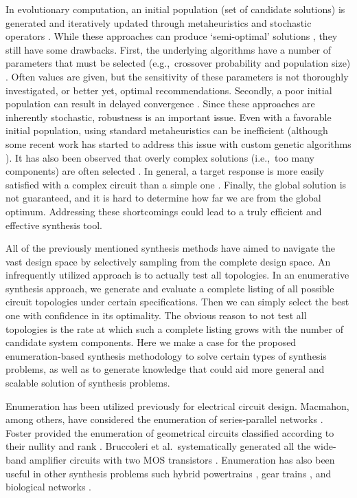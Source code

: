 In evolutionary computation, an initial population (set of candidate solutions) is generated and iteratively updated through metaheuristics and stochastic operators \cite{Eiben2003a}.
While these approaches  can produce `semi-optimal' solutions \cite{Das2007a}, they still have some drawbacks. 
First, the underlying algorithms have a number of parameters that must be selected (e.g.,~crossover probability and population size) \cite{Eiben2003a, Grimbleby1995a, Goh2001a, Koza1997a, Lohn1999a}.
Often values are given, but the sensitivity of these parameters is not thoroughly investigated, or better yet, optimal recommendations.
Secondly, a poor initial population can result in delayed convergence \cite{Das2007a}.
Since these approaches are inherently stochastic, robustness is an important issue.
Even with a favorable initial population, using standard metaheuristics can be inefficient (although some recent work has started to address this issue with custom genetic algorithms \cite{Das2007a}).
It has also been observed that overly complex solutions (i.e.,~too many components) are often selected \cite{Goh2001a, Grimbleby1995a, Grimbleby2000a}. 
In general, a target response is more easily satisfied with a complex circuit than a simple one \cite{Grimbleby1995a}.
Finally, the global solution is not guaranteed, and it is hard to determine how far we are from the global optimum.
Addressing these shortcomings could lead to a truly efficient and effective synthesis tool.

All of the previously mentioned synthesis methods have aimed to navigate the vast design space by selectively sampling from the complete design space.
An infrequently utilized approach is to actually test all topologies. %
In an enumerative synthesis approach, we generate and evaluate a complete listing of all possible circuit topologies under certain specifications.
Then we can simply select the best one with confidence in its optimality.
The obvious reason to not test all topologies is the rate at which such a complete listing grows with the number of candidate system components. Here we make a case for the proposed enumeration-based synthesis methodology to solve certain types of synthesis problems, as well as to generate knowledge that could aid more general and scalable solution of synthesis problems.

Enumeration has been utilized previously for electrical circuit design.
Macmahon, among others, have considered the enumeration of series-parallel networks \cite{Macmahon1994a, Lomnicki1972a, Isokawa2016a}.
Foster provided the enumeration of geometrical circuits classified according to their nullity and rank \cite{Foster1932a}.
Bruccoleri et al.~systematically generated all the wide-band amplifier circuits with two MOS transistors \cite{Bruccoleri2001a, Klumperink1997a}. 
Enumeration has also been useful in other synthesis problems such hybrid powertrains \cite{Bayrak2016a}, gear trains \cite{Castillo2002a}, and biological networks \cite{Ma2009a}.

